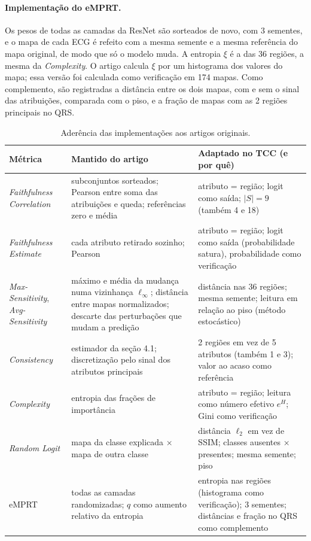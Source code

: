 \documentclass[11pt,a4paper]{article}
\newcommand{\fonte}[1]{\par\vspace{2pt}{\centering\footnotesize Fonte: #1\par}}
\newcommand{\FC}{\textit{Faithfulness Correlation}}
\newcommand{\FE}{\textit{Faithfulness Estimate}}
\newcommand{\MS}{\textit{Max-Sensitivity}}
\newcommand{\AS}{\textit{Avg-Sensitivity}}
\newcommand{\CX}{\textit{Complexity}}
\newcommand{\CS}{\textit{Consistency}}
\newcommand{\RL}{\textit{Random Logit}}
\newcommand{\EM}{eMPRT}
\begin{document}
\paragraph{Implementação do \EM.} Os pesos de todas as camadas da ResNet são sorteados de novo, com 3 sementes, e o mapa de cada ECG é refeito com a mesma semente e a mesma referência do mapa original, de modo que só o modelo muda. A entropia $\xi$ é a das 36 regiões, a mesma da \CX. O artigo calcula $\xi$ por um histograma dos valores do mapa; essa versão foi calculada como verificação em 174 mapas. Como complemento, são registradas a distância entre os dois mapas, com e sem o sinal das atribuições, comparada com o piso, e a fração de mapas com as 2 regiões principais no QRS.

\begin{table}[H]\centering\small
\caption{Aderência das implementações aos artigos originais.}\label{tab:adesao}
\begin{tabularx}{\linewidth}{>{\raggedright\arraybackslash}p{2.5cm}>{\raggedright\arraybackslash}p{4.6cm}X}
\toprule
\textbf{Métrica} & \textbf{Mantido do artigo} & \textbf{Adaptado no TCC (e por quê)} \\
\midrule
\FC & subconjuntos sorteados; Pearson entre soma das atribuições e queda; referências zero e média & atributo = região; logit como saída; $|S| = 9$ (também 4 e 18) \\ \addlinespace
\FE & cada atributo retirado sozinho; Pearson & atributo = região; logit como saída (probabilidade satura), probabilidade como verificação \\ \addlinespace
\MS, \AS & máximo e média da mudança numa vizinhança $\ell_\infty$; distância entre mapas normalizados; descarte das perturbações que mudam a predição & distância nas 36 regiões; mesma semente; leitura em relação ao piso (método estocástico) \\ \addlinespace
\CS & estimador da seção 4.1; discretização pelo sinal dos atributos principais & 2 regiões em vez de 5 atributos (também 1 e 3); valor ao acaso como referência \\ \addlinespace
\CX & entropia das frações de importância & atributo = região; leitura como número efetivo $e^H$; Gini como verificação \\ \addlinespace
\RL & mapa da classe explicada × mapa de outra classe & distância $\ell_2$ em vez de SSIM; classes ausentes × presentes; mesma semente; piso \\ \addlinespace
\EM & todas as camadas randomizadas; $q$ como aumento relativo da entropia & entropia nas regiões (histograma como verificação); 3 sementes; distâncias e fração no QRS como complemento \\
\bottomrule
\end{tabularx}
\fonte{Elaborado pelo autor.}
\end{table}
\end{document}
